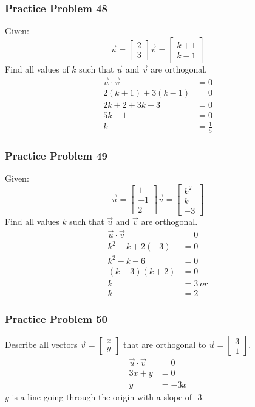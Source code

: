 \documentclass[letterpaper, 12pt]{math}
\begin{document}
\subsubsection*{Practice Problem 48}
Given:
\[ \vec{u} = \begin{bmatrix}2 \\ 3\end{bmatrix}
  \vec{v} = \begin{bmatrix}k+1 \\ k-1\end{bmatrix} \]
Find all values of \( k \) such that \( \vec{u} \) and \( \vec{v} \) are
orthogonal.
\begin{align*}
  \vec{u}\cdot\vec{v} &= 0 \\
  2(k+1)+3(k-1) &= 0 \\
  2k+2+3k-3 &= 0 \\
  5k-1 &= 0 \\
  k &= \frac{1}{5}
\end{align*}

\subsubsection*{Practice Problem 49}
Given:
\[ \vec{u} = \begin{bmatrix}1 \\ -1 \\ 2\end{bmatrix}
  \vec{v} = \begin{bmatrix}k^2 \\ k \\ -3\end{bmatrix} \]
Find all values \( k \) such that \( \vec{u} \) and \( \vec{v} \) are
orthogonal.
\begin{align*}
  \vec{u}\cdot\vec{v} &= 0 \\
  k^2-k+2(-3) &= 0 \\
  k^2-k-6 &= 0 \\
  (k-3)(k+2) &= 0 \\
  k &= 3\ or \\
  k &= 2
\end{align*}

\subsubsection*{Practice Problem 50}
Describe all vectors \( \vec{v} = \begin{bmatrix}x \\ y\end{bmatrix} \) that
are orthogonal to \( \vec{u} = \begin{bmatrix}3 \\ 1\end{bmatrix} \).
\begin{align*}
  \vec{u}\cdot\vec{v} &= 0 \\
  3x+y &= 0 \\
  y &= -3x
\end{align*}
\( y \) is a line going through the origin with a slope of -3.
\end{document}
